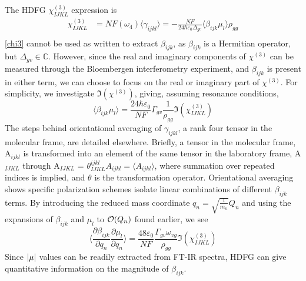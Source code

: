 \documentclass[aip, jcp, reprint, twocolumn]{revtex4-2}
\begin{document}
The HDFG $\chi^{(3)}_{IJKL}$ expression is
\begin{equation}\label{chi3}
\begin{split}
		\chi^{(3)}_{IJKL} &= NF(\omega_4) \langle \gamma_{ijkl} \rangle = -\frac{NF}{24 \hbar \varepsilon_0 \Delta_{gv}} \langle \beta_{ijk} \mu_l \rangle \rho_{gg}\\
\end{split}
\end{equation}
\autoref{chi3} cannot be used as written to extract $\beta_{ijk}$, as $\beta_{ijk}$ is a Hermitian operator, but $\Delta_{gv} \in \mathbb{C}$. 
However, since the real and imaginary components of $\chi^{(3)}$ can be measured through the Bloembergen interferometry experiment, and $\beta_{ijk}$ is present in either term, we can choose to focus on the real or imaginary part of $\chi^{(3)}$.
For simplicity, we investigate $\Im(\chi^{(3)})$, giving, assuming resonance conditions, 
\begin{equation}
	\langle \beta_{ijk} \mu_{l} \rangle = \frac{24 \hbar \varepsilon_0}{NF} \Gamma_{gv} \frac{1}{\rho_{gg}} \Im(\chi^{(3)}_{IJKL})
\end{equation}
The steps behind orientational averaging of $\gamma_{ijkl}$, a rank four tensor in the molecular frame, are detailed elsewhere.\cite{Andrews1977, McDonnell2024}
Briefly, a tensor in the molecular frame, A$_{ijkl}$ is transformed into an element of the same tensor in the laboratory frame, A$_{IJKL}$ through A$_{IJKL}$ = $\theta^{ijkl}_{IJKL} A_{ijkl} = \langle A_{ijkl} \rangle$, where summation over repeated indices is implied, and $\theta$ is the transformation operator. \cite{McDonnell2024}
Orientational averaging shows specific polarization schemes isolate linear combinations of different $\beta_{ijk}$ terms. \cite{Cyvin1965, Bersohn1966, Kauranen1996}
By introducing the reduced mass coordinate $q_n = \sqrt{\frac{1}{m_n}} Q_n$ and using the expansions of $\beta_{ijk}$ and $\mu_{l}$ to $\order{Q_n}$ found earlier, we see
\begin{equation}\label{betasive}
	\langle \frac{\partial \beta_{ijk}}{\partial q_n} {\frac{\partial \mu_l}{\partial q_n}} \rangle = \frac{48 \varepsilon_0}{NF}  \frac{\Gamma_{gv} \omega_{vg}}{\rho_{gg}} {\Im(\chi^{(3)}_{IJKL})}
\end{equation}
Since $\abs{\mu}$ values can be readily extracted from FT-IR spectra,\cite{RN119, RN412} HDFG can give quantitative information on the magnitude of $\beta_{ijk}$.
\end{document}
